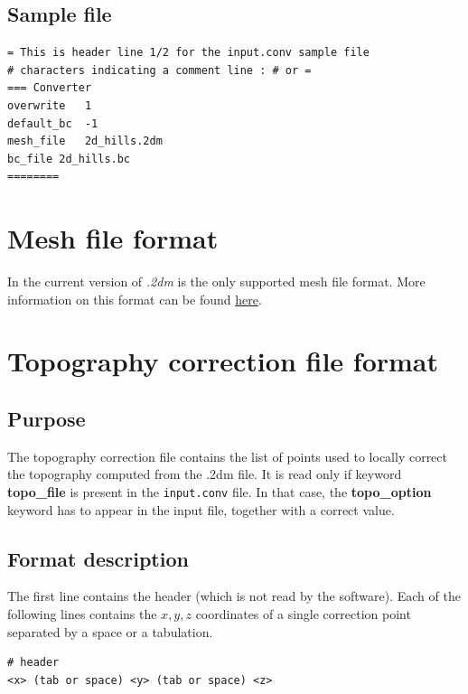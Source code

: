 \subsection{Sample file}
\begin{verbatim}
= This is header line 1/2 for the input.conv sample file
# characters indicating a comment line : # or =
=== Converter
overwrite   1
default_bc  -1
mesh_file   2d_hills.2dm
bc_file	2d_hills.bc
========
\end{verbatim}
\section{\label{sec:SMS_file}Mesh file format}
In the current version of \swdd \emph{.2dm}  is the only supported mesh file format.
More information on this format can be found \href{https://www.xmswiki.com/wiki/SMS:2D_Mesh_Files_*.2dm}{here}.
\section{\label{sec:topo_file}Topography correction file format  }

\subsection{Purpose}
The topography correction file contains the list of points used to locally correct the topography computed from the .2dm file. It is read only if keyword \textbf{topo\_file} is present in the \texttt{input.conv} file.  In that case, the \textbf{topo\_option} keyword has to appear in the input file, together with a correct value.\\

{}

\subsection{Format description}
The first line contains the header (which is not read by the software). Each of the following lines contains the $x,y,z$ coordinates of a single correction point separated by a space or a tabulation.
\begin{lstlisting}
# header 
<x> (tab or space) <y> (tab or space) <z>
\end{lstlisting}


